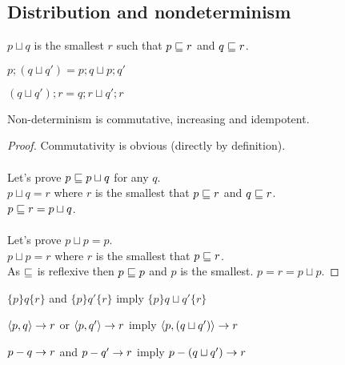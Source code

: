 \documentclass{article}
\begin{document}
\subsection*{Distribution and nondeterminism}

\begin{definition}[$\sqcup$]
$p \sqcup q$ is the smallest $r$ such that $p \sqsubseteq r$ and $q \sqsubseteq r$.
\end{definition}

\begin{law}
$p; (q \sqcup q') = p; q \sqcup p; q'$
\end{law}

\begin{law}
$(q \sqcup q'); r = q; r \sqcup q'; r$
\end{law}

\begin{lemma}
Non-determinism is commutative, increasing and idempotent.
\end{lemma}

\verified

\begin{proof}
Commutativity is obvious (directly by definition).\\
\\
Let's prove $p \sqsubseteq p \sqcup q$ for any $q$.\\
$p \sqcup q = r$ where $r$ is the smallest that $p \sqsubseteq r$ and $q \sqsubseteq r$.\\
$p \sqsubseteq r = p \sqcup q$.\\
\\
Let's prove $p \sqcup p = p$.\\
$p \sqcup p = r$ where $r$ is the smallest that $p \sqsubseteq r$.\\
As $\sqsubseteq$ is reflexive then $p \sqsubseteq p$ and $p$ is the smallest.
$p = r = p \sqcup p$.
\end{proof}

\begin{rul}
$\{p\}q\{r\}$ and $\{p\}q'\{r\}$ imply $\{p\} q \sqcup q' \{r\}$
\end{rul}

\begin{rul}
$\left< p, q \right> \rightarrow r$ or $\left< p, q' \right> \rightarrow r$ imply $\left< p, (q \sqcup q') \right> \rightarrow r$
\end{rul}

\begin{rul}
$p-q\rightarrow r$ and $p-q'\rightarrow r$ imply $p-(q \sqcup q')\rightarrow r$
\end{rul}
\end{document}
